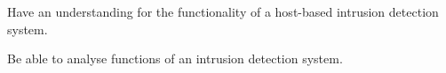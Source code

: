 \item Have an understanding for the functionality of a host-based intrusion 
detection system.
\item Be able to analyse functions of an intrusion detection system.
